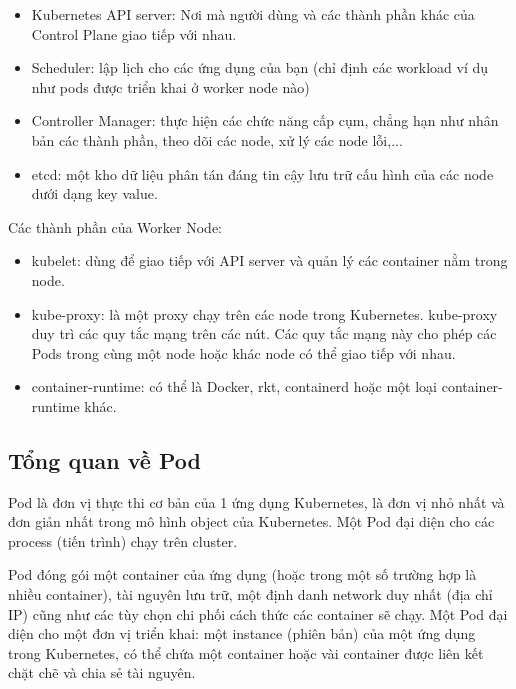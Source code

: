 \documentclass[14pt,a4paper]{report}
\begin{document}
	\begin{itemize}				
		\item Kubernetes API server: Nơi mà người dùng và các thành phần khác của Control Plane giao tiếp với nhau.
		\item Scheduler: lập lịch cho các ứng dụng của bạn (chỉ định các workload ví dụ như pods được triển khai ở worker node nào)
		\item  Controller Manager: thực hiện các chức năng cấp cụm, chẳng hạn như nhân bản các thành phần, theo dõi các node, xử lý các node lỗi,...
		\item etcd: một kho dữ liệu phân tán đáng tin cậy lưu trữ cấu hình của các node dưới dạng key value.
	\end{itemize}
	
	{Các thành phần của Worker Node:\\}
	
	\begin{itemize}				
		\item kubelet: dùng để giao tiếp với API server và quản lý các container nằm trong node.
		\item kube-proxy: là một proxy chạy trên các node trong  Kubernetes. kube-proxy duy trì các quy tắc mạng trên các nút. Các quy tắc mạng này cho phép các Pods trong cùng một node hoặc khác node có thể giao tiếp với nhau.
		\item container-runtime: có thể là Docker, rkt, containerd hoặc một loại container-runtime khác.
	\end{itemize}
	
	\subsection{Tổng quan về Pod}
	{\hspace{1cm}Pod là đơn vị thực thi cơ bản của 1 ứng dụng Kubernetes, là đơn vị nhỏ nhất và đơn giản nhất trong mô hình object của Kubernetes. Một Pod đại diện cho các process (tiến trình) chạy trên cluster.\\}
	
	\hspace{0.3cm}Pod đóng gói một container của ứng dụng (hoặc trong một số trường hợp là nhiều container), tài nguyên lưu trữ, một định danh network duy nhất (địa chỉ IP) cũng như các tùy chọn chi phối cách thức các container sẽ chạy. Một Pod đại diện cho một đơn vị triển khai: một instance (phiên bản) của một ứng dụng trong Kubernetes, có thể chứa một container hoặc vài container được liên kết chặt chẽ và chia sẻ tài nguyên.\\
	
\end{document}
